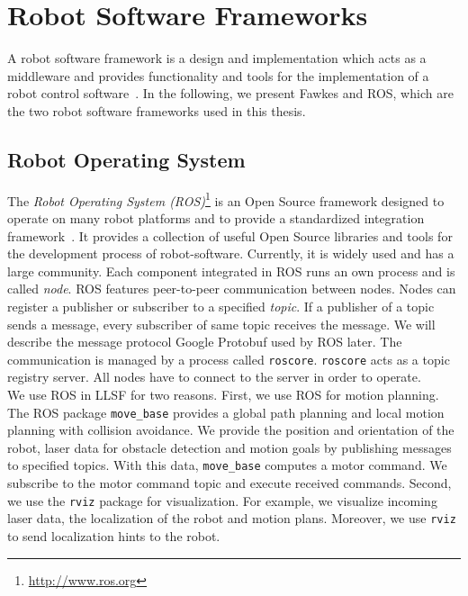 \section{Robot Software Frameworks}
\label{sec:robot_software_frameworks}
A robot software framework is a design and implementation which acts as a middleware and provides functionality and tools for the implementation of a robot control software~\cite{tnthesis}. In the following, we present Fawkes and ROS, which are the two robot software frameworks used in this thesis.

\subsection{Robot Operating System}
The \textit{Robot Operating System (ROS)}\footnote{\url{http://www.ros.org}} is an Open Source framework designed to operate on many robot platforms and to provide a standardized integration framework~\cite{Ros}. It provides a collection of useful Open Source libraries and tools for the development process of robot-software. Currently, it is widely used and has a large community. Each component integrated in ROS runs an own process and is called \textit{node}. ROS features peer-to-peer communication between nodes. Nodes can register a publisher or subscriber to a specified \textit{topic}. If a publisher of a topic sends a message, every subscriber of same topic receives the message. We will describe the message protocol Google Protobuf used by ROS later. The communication is managed by a process called \texttt{roscore}. \texttt{roscore} acts as a topic registry server. All nodes have to connect to the server in order to operate.\\
We use ROS in LLSF for two reasons. First, we use ROS for motion planning. The ROS package \texttt{move\_base} provides a global path planning and local motion planning with collision avoidance. We provide the position and orientation of the robot, laser data for obstacle detection and motion goals by publishing messages to specified topics. With this data, \texttt{move\_base} computes a motor command. We subscribe to the motor command topic and execute received commands. Second, we use the \texttt{rviz} package for visualization. For example, we visualize incoming laser data, the localization of the robot and motion plans. Moreover, we use \texttt{rviz} to send localization hints to the robot.

